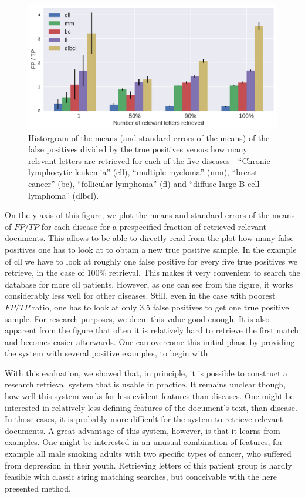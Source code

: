 \begin{figure}[t]
	\includegraphics[width=\textwidth]{figures/intelligent_search}
	\caption{Historgram of the means (and standard errors of the means) of the false positives divided by the true positives versus how many relevant letters are retrieved for each of the five diseases---``Chronic lymphocytic leukemia'' (cll), ``multiple myeloma'' (mm), ``breast cancer'' (bc), ``follicular lymphoma'' (fl) and ``diffuse large B-cell lymphoma'' (dlbcl).}
	\label{fig:intelligent_search}
\end{figure} 

On the y-axis of this figure, we plot the means and standard errors of the means of $FP/TP$ for each disease for a prespecified fraction of retrieved relevant documents. This allows to be able to directly read from the plot how many false positives one has to look at to obtain a new true positive sample. In the example of cll we have to look at roughly one false positive for every five true positives we retrieve, in the case of 100\% retrieval. This makes it very convenient to search the database for more cll patients. However, as one can see from the figure, it works considerably less well for other diseases. Still, even in the case with poorest $FP/TP$ ratio, one has to look at only 3.5 false positives to get one true positive sample. For research purposes, we deem this value good enough. It is also apparent from the figure that often it is relatively hard to retrieve the first match and becomes easier afterwards. One can overcome this initial phase by providing the system with several positive examples, to begin with.

With this evaluation, we showed that, in principle, it is possible to construct a research retrieval system that is usable in practice. It remains unclear though, how well this system works for less evident features than diseases. One might be interested in relatively less defining features of the document's text, than disease. In those cases, it is probably more difficult for the system to retrieve relevant documents. A great advantage of this system, however, is that it learns from examples. One might be interested in an unusual combination of features, for example all male smoking adults with two specific types of cancer, who suffered from depression in their youth. Retrieving letters of this patient group is hardly feasible with classic string matching searches, but conceivable with the here presented method.

